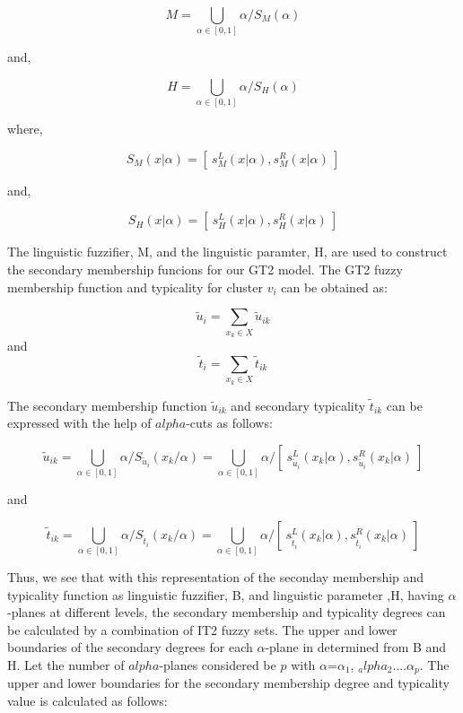 \documentclass[journal, onecolumn]{IEEEtran}
\begin{document}
\begin{equation}
M= \bigcup _{\alpha \in{[0,1]}} \alpha / S_M(\alpha)
\end{equation}

and, 

\begin{equation}
H= \bigcup _{\alpha \in{[0,1]}} \alpha / S_H(\alpha)
\end{equation}

where, 

\begin{equation}
S_{M}(x|\alpha)= [\: s_{M}^L(x|\alpha), s_{M}^R(x|\alpha) \:]
\end{equation}

and, 

\begin{equation}
S_{H}(x|\alpha)= [\: s_{H}^L(x|\alpha), s_{H}^R(x|\alpha) \:]
\end{equation}


The linguistic fuzzifier, M, and the linguistic paramter, H, are used to construct the secondary membership funcions for our GT2 model. The GT2 fuzzy membership function and typicality for cluster $v_i$ can be obtained as:

\begin{equation}
{\tilde{u}}_{i}= \sum_{x_k \in{X}} {\tilde{u}}_{ik}
\end{equation}
and
\begin{equation}
{\tilde{t}}_{i}= \sum_{x_k \in{X}} {\tilde{t}}_{ik}
\end{equation}
 
The secondary membership function ${\tilde{u}}_{ik}$ and secondary typicality ${\tilde{t}}_{ik}$  can be expressed with the help of $alpha$-cuts as follows:

\begin{equation}
{\tilde{u}}_{ik}= \bigcup _{\alpha \in{[0,1]}} \alpha / S_{{\tilde{u}}_i}(x_k/\alpha) = \bigcup _{\alpha \in{[0,1]}} \alpha / [\: s_{{\tilde{u}}_i}^L(x_k|\alpha), s_{{\tilde{u}}_i}^R(x_k|\alpha) \:]
\end{equation}

and

\begin{equation}
{\tilde{t}}_{ik}= \bigcup _{\alpha \in{[0,1]}} \alpha / S_{{\tilde{t}}_i}(x_k/\alpha) = \bigcup _{\alpha \in{[0,1]}} \alpha / [\: s_{{\tilde{t}}_i}^L(x_k|\alpha), s_{{\tilde{t}}_i}^R(x_k|\alpha) \:]
\end{equation}

Thus, we see that with this representation of the seconday membership and typicality function as linguistic fuzzifier, B, and linguistic parameter ,H, having $\alpha$-planes at different levels, the secondary membership and typicality degrees can be calculated by a combination of IT2 fuzzy sets. The
upper and lower boundaries of the secondary degrees for each $\alpha$-plane in determined from B and H. Let the number of $alpha$-planes considered be $p$ with $\alpha$={$\alpha_1$, $_alpha_2$....$\alpha_p$}. The upper and lower boundaries for the secondary membership degree and typicality value is calculated as follows:
\end{document}
